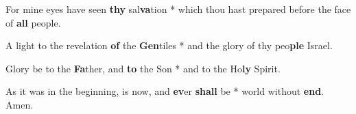 \begin{multicols}{2}
	
	For mine eyes have seen \textbf{thy} sal\textbf{va}tion * which thou hast prepared before the face of \textbf{all} people.
	
%	
%	
	A light to the revelation \textbf{of} the \textbf{Gen}tiles * and the glory of thy peo\textbf{ple} Israel.
	
	Glory be to the \textbf{Fa}ther, and \textbf{to} the Son * and to the Ho\textbf{ly} Spirit.
	
	As it was in the beginning, is now, and \textbf{ev}er \textbf{shall} be * world without \textbf{end}. Amen.
\end{multicols}